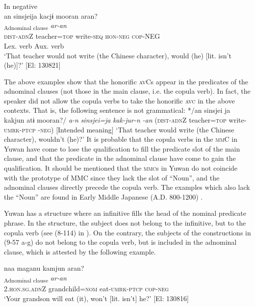 \ex  In negative\\
 \gllll  an  sinsjeija  kacjɨ  mooran  aran?\\
    [\textit{a-n}  \textit{sinsjei=ja}  \textit{kak-tɨ}  \textit{moor-an}]\textsubscript{Adnominal clause}  \textit{ar-an}\\
    \textsc{dist}-\textsc{adn}Z  teacher=\textsc{top}  write-\textsc{seq}  \textsc{hon}-\textsc{neg}  \textsc{cop}-NEG\\
        Lex. verb  Aux. verb  \\
    \glt     ‘That teacher would not write (the Chinese character), would (he) [lit. isn’t (he)]?’ [El: 130821]
    \z
\z

The above examples show that the honorific \textsc{av}Cs appear in the predicates of the adnominal clauses (not those in the main clause, i.e. the copula verb). In fact, the speaker did not allow the copula verbs to take the honorific \textsc{avc} in the above contexts. That is, the following sentence is not grammatical: */an sinsjei ja kakjun atɨ mooran?/ \textit{a-n} \textit{sinsjei=ja} \textit{kak-jur-n} \textit{} \textit{-an} (\textsc{dist}-\textsc{adn}Z teacher=\textsc{top} write-\textsc{umrk}-\textsc{ptcp} -\textsc{neg}) [Intended meaning] ‘That teacher would write (the Chinese character), wouldn’t (he)?’ It is probable that the copula verbs in the \textsc{mm}C in Yuwan have come to lose the qualification to fill the predicate slot of the main clause, and that the predicate in the adnominal clause have come to gain the qualification. It should be mentioned that the \textsc{mmc}s in Yuwan do not coincide with the prototype of MMC since they lack the slot of “Noun”, and the adnominal clauses directly precede the copula verb. The examples which also lack the “Noun” are found in Early Middle Japanese (A.D. 800-1200) \citep[203-205]{Miyachi2013}.

Yuwan has a structure where an infinitive fills the head of the nominal predicate phrase. In the structure, the subject does not belong to the infinitive, but to the copula verb (see (8-114) in ). On the contrary, the subjects of the constructions in (9-57 a-g) do not belong to the copula verb, but is included in the adnominal clause, which is attested by the following example.

\ea    \label{ex:9.59}
 \glll  naa  maganu  kamjun  aran?\\
    [\textit{naa}  \textit{maga=\Highlight{nu}}  \textit{kam-jur-n}]\textsubscript{Adnominal clause}  \textit{ar-an}\\
    2.\textsc{hon}.\textsc{sg}.\textsc{adn}Z  grandchild=\textsc{nom}  eat-\textsc{umrk}-\textsc{ptcp}  \textsc{cop}-\textsc{neg}\\
    \glt     ‘Your grandson will eat (it), won’t [lit. isn’t] he?’ [El: 130816]
\z


